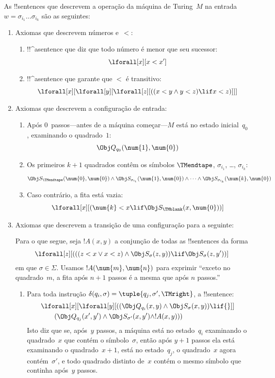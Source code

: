 \documentclass[../../../include/open-logic-section]{subfiles}
\begin{document}
As !!{sentence}s que descrevem a operação da máquina de Turing~$M$ na
entrada $w = \sigma_{i_1}\dots\sigma_{i_k}$ são as seguintes:
\begin{enumerate}
\item Axiomas que descrevem números e~$<$:
\begin{enumerate}
\item !!^a{sentence} que diz que todo número é menor que seu sucessor:
\[
\lforall[x][x < x']
\]
\item !!^a{sentence} que garante que $<$ é transitivo:
\[
\lforall[x][\lforall[y][\lforall[z][
      ((x < y \land y < z) \lif x < z)]]]
\]
\end{enumerate}
\item Axiomas que descrevem a configuração de entrada:
\begin{enumerate}
\item Após $0$~passos---antes de a máquina começar---$M$ está no
  estado inicial~$q_0$, examinando o quadrado~$1$:
\[
\Obj Q_{q_0}(\num{1}, \num{0})
\]
\item Os primeiros $k+1$ quadrados contêm os símbolos $\TMendtape$,
  $\sigma_{i_1}$, \dots, $\sigma_{i_k}$:
\[
\Obj S_\TMendtape(\num{0}, \num{0}) \land
\Obj S_{\sigma_{i_1}}(\num{1}, \num{0}) \land
\dots \land
\Obj S_{\sigma_{i_k}}(\num{k}, \num{0})
\]
\item Caso contrário, a fita está vazia:
\[
\lforall[x][(\num{k} < x \lif \Obj S_\TMblank(x, \num{0}))]
\]
\end{enumerate}
\item Axiomas que descrevem a transição de uma configuração para a
  seguinte:

Para o que segue, seja $!A(x, y)$ a conjunção de todas as
!!{sentence}s da forma
\[
\lforall[z][
  (((z < x \lor x < z) \land \Obj S_\sigma(z, y))
  \lif \Obj S_\sigma(z, y'))]
\]
em que $\sigma \in \Sigma$.  Usamos $!A(\num{m},\num{n})$ para exprimir
``exceto no quadrado~$m$, a fita após $n+1$ passos é a mesma que após
$n$ passos.''
\begin{enumerate}
\item {} Para toda instrução $\delta(q_i, \sigma) =
  \tuple{q_j, \sigma', \TMright}$, a !!{sentence}:
\begin{align*}
& \lforall[x][\lforall[y][(
   (\Obj Q_{q_i}(x, y) \land \Obj S_{\sigma}(x, y)) \lif {}]] \\
&\qquad   (\Obj Q_{q_j}(x', y') \land \Obj S_{\sigma'}(x, y') \land
!A(x, y)))
\end{align*}
Isto diz que se, após~$y$ passos, a máquina está no estado~$q_i$
examinando o quadrado~$x$ que contém o símbolo~$\sigma$, então após
$y+1$ passos ela está examinando o quadrado~$x+1$, está no
estado~$q_j$, o quadrado~$x$ agora contém~$\sigma'$, e todo quadrado
distinto de~$x$ contém o mesmo símbolo que continha após~$y$ passos.


\end{enumerate}
\end{enumerate}
\end{document}
